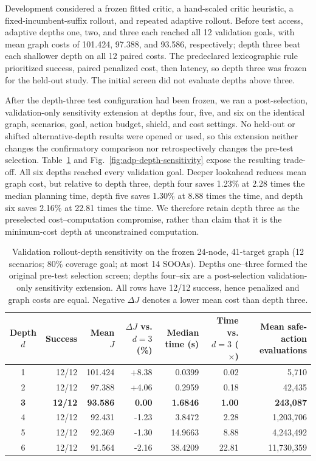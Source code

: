 \documentclass{IEEEtaes}
\theoremstyle{remark}
\theoremstyle{plain}
\begin{document}
Development considered a frozen fitted critic, a hand-scaled critic heuristic, a fixed-incumbent-suffix rollout, and repeated adaptive rollout. Before test access, adaptive depths one, two, and three each reached all 12 validation goals, with mean graph costs of 101.424, 97.388, and 93.586, respectively; depth three beat each shallower depth on all 12 paired costs. The predeclared lexicographic rule prioritized success, paired penalized cost, then latency, so depth three was frozen for the held-out study. The initial screen did not evaluate depths above three.

After the depth-three test configuration had been frozen, we ran a post-selection, validation-only sensitivity extension at depths four, five, and six on the identical graph, scenarios, goal, action budget, shield, and cost settings. No held-out or shifted alternative-depth results were opened or used, so this extension neither changes the confirmatory comparison nor retrospectively changes the pre-test selection. Table~\ref{tab:depth-sensitivity} and Fig.~\ref{fig:adp-depth-sensitivity} expose the resulting trade-off. All six depths reached every validation goal. Deeper lookahead reduces mean graph cost, but relative to depth three, depth four saves 1.23\% at 2.28 times the median planning time, depth five saves 1.30\% at 8.88 times the time, and depth six saves 2.16\% at 22.81 times the time. We therefore retain depth three as the preselected cost--computation compromise, rather than claim that it is the minimum-cost depth at unconstrained computation.

\begin{table}[t]
  \centering
  \caption{Validation rollout-depth sensitivity on the frozen 24-node, 41-target graph (12 scenarios; 80\% coverage goal; at most 14 SOOAs). Depths one--three formed the original pre-test selection screen; depths four--six are a post-selection validation-only sensitivity extension. All rows have 12/12 success, hence penalized and graph costs are equal. Negative $\Delta J$ denotes a lower mean cost than depth three.}
  \label{tab:depth-sensitivity}
  \renewcommand{\arraystretch}{1.08}
  \setlength{\tabcolsep}{5pt}
  \footnotesize
  \begin{tabular}{@{}crrrrrr@{}}
    \toprule
    Depth $d$ & Success & Mean $J$ & $\Delta J$ vs. $d=3$ (\%) & Median time (s) & Time vs. $d=3$ ($\times$) & Mean safe-action evaluations \\
    \midrule
    1 & 12/12 & 101.424 & +8.38 & 0.0399 & 0.02 & 5,710 \\
    2 & 12/12 & 97.388 & +4.06 & 0.2959 & 0.18 & 42,435 \\
    \textbf{3} & \textbf{12/12} & \textbf{93.586} & \textbf{0.00} & \textbf{1.6846} & \textbf{1.00} & \textbf{243,087} \\
    4 & 12/12 & 92.431 & -1.23 & 3.8472 & 2.28 & 1,203,706 \\
    5 & 12/12 & 92.369 & -1.30 & 14.9663 & 8.88 & 4,243,492 \\
    6 & 12/12 & 91.564 & -2.16 & 38.4209 & 22.81 & 11,730,359 \\
    \bottomrule
  \end{tabular}
\end{table}
\end{document}
